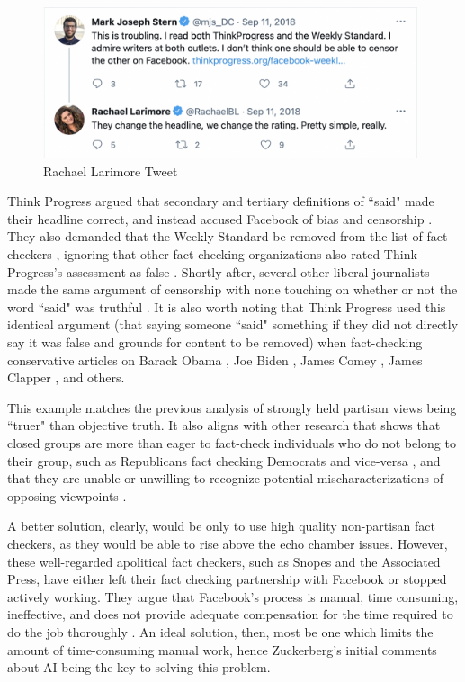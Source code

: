 \documentclass[preprint,review,12pt]{elsarticle}
\begin{document}
 \begin{figure}[h]
    \centering
    \includegraphics[width=11cm]{Larimore Tweet.png}
    \caption{Rachael Larimore Tweet \cite{larimore2018tweet}}
    \label{fig:Rachael Larimore Tweet, Sep 11, 2018}
\end{figure} 
Think Progress argued that secondary and tertiary definitions of ``said" made their headline correct, and instead accused Facebook of bias and censorship \cite{legum2018tweet}. They also demanded that the Weekly Standard be removed from the list of fact-checkers \cite{Millhiser2018Facebook}, ignoring that other fact-checking organizations also rated Think Progress's assessment as false \cite{gore2018kavanaugh,tobias2018kavanaugh}.
Shortly after, several other liberal journalists made the same argument of censorship with none touching on whether or not the word ``said" was truthful \cite{froomkin2018tweet,grim2018tweet,beutler2018tweet}. It is also worth noting that Think Progress used this identical argument (that saying someone ``said" something if they did not directly say it was false and grounds for content to be removed) when fact-checking conservative articles on Barack Obama \cite{legum2008context}, Joe Biden \cite{volsky2016biden}, James Comey \cite{israel2018rnc}, James Clapper \cite{lerner2015cruz}, and others. 
 
 This example matches the previous analysis of strongly held partisan views being ``truer" than objective truth. It also aligns with other research that shows that closed groups are more than eager to fact-check individuals who do not belong to their group, such as Republicans fact checking Democrats and vice-versa \cite{shin2017partisan,iyengar2015fear}, and that they are unable or unwilling to recognize potential mischaracterizations of opposing viewpoints \cite{pennycook2019lazy,vargo2018agenda}. 
 
A better solution, clearly, would be only to use high quality non-partisan fact checkers, as they would be able to rise above the echo chamber issues. However, these well-regarded apolitical fact checkers, such as Snopes and the Associated Press, have either left their fact checking partnership with Facebook or stopped actively working. They argue that Facebook's process is manual, time consuming, ineffective, and does not provide adequate compensation for the time required to do the job thoroughly \cite{green2019message,coldeway2019update}. An ideal solution, then, most be one which limits the amount of time-consuming manual work, hence Zuckerberg's initial comments about AI being the key to solving this problem.
\end{document}
